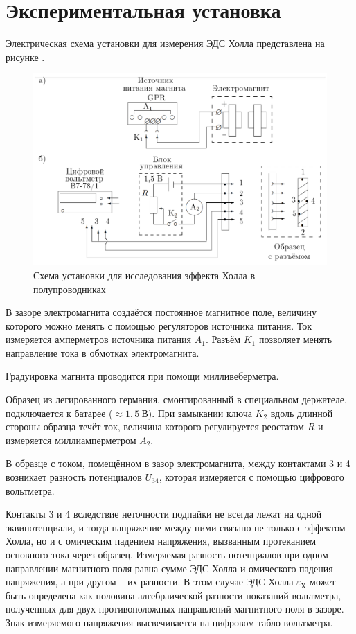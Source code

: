 \documentclass[a4paper,10pt]{article}
\begin{document}
\section*{Экспериментальная установка}

Электрическая схема установки для измерения ЭДС Холла представлена на рисунке . 

\begin{figure}[h]
	\centering
	\includegraphics[scale=0.35]{Device}
	\caption{Схема установки для исследования эффекта Холла в полупроводниках} \label{Device}
\end{figure}

В зазоре электромагнита создаётся постоянное магнитное поле, величину которого можно менять с помощью регуляторов источника питания. Ток измеряется амперметров источника питания $A_1$. Разъём $K_1$ позволяет менять направление тока в обмотках электромагнита.

Градуировка магнита проводится при помощи милливеберметра.

Образец из легированного германия, смонтированный в специальном держателе, подключается к батарее ($\approx1,5~\text{В}$). При замыкании ключа $K_2$ вдоль длинной стороны образца течёт ток, величина которого регулируется реостатом $R$ и измеряется миллиамперметром $A_2$.

В образце с током, помещённом в зазор электромагнита, между контактами 3 и 4 возникает разность потенциалов $U_{34}$, которая измеряется с помощью цифрового вольтметра.

Контакты 3 и 4 вследствие неточности подпайки не всегда лежат на одной эквипотенциали, и тогда напряжение между ними связано не только с эффектом Холла, но и с омическим падением напряжения, вызванным протеканием основного тока через образец. Измеряемая разность потенциалов при одном направлении магнитного поля равна сумме ЭДС Холла и омического падения напряжения, а при другом -- их разности. В этом случае ЭДС Холла $\varepsilon_{\text{Х}}$ может быть определена как половина алгебраической разности показаний вольтметра, полученных для двух противоположных направлений магнитного поля в зазоре. Знак измеряемого напряжения высвечивается на цифровом табло вольтметра.
\end{document}
